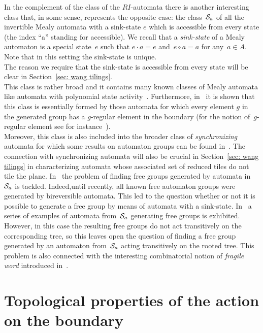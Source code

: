 \documentclass{amsart}
\begin{document}
In the complement of the class of the $RI$-automata there is
another interesting class that, in some sense, represents the opposite case: the class~${\hbox{${\mathcal S}_{a}$}}$ of all the invertible Mealy automata with a sink-state $e$ which is accessible from every state (the index ``a'' standing for accessible). We recall that a \emph{sink-state} of a Mealy automaton is a special state~$e$ such that $e{{{\cdot}}} a=e$ and~$e{{{\circ}}} a=a$ for any~$a\in A$. Note that in this setting the sink-state is unique.\\
The reason we require that the sink-state is accessible from every state will be clear in Section~\ref{sec: wang tilings}.\\
This class is rather broad and it contains many known classes of Mealy automata like automata with polynomial state activity~\cite{Sidki}. Furthermore, in~\cite[Proposition 6]{DaRo14} it is shown that this class is essentially formed by those automata for which every element $g$ in the generated group has a $g$-regular element in the boundary (for the notion of~$g$-regular element see for instance~\cite{Nekra10}).\\
  Moreover, this class is also included into the broader class of \emph{synchronizing} automata for which some results on automaton groups can be found in~\cite{DaRo13}. The connection with synchronizing automata will also be crucial in Section~\ref{sec: wang tilings} in characterizing automata whose associated set of reduced tiles do not tile the plane. In~\cite{DaRo15}  the problem of finding free groups generated by automata in~${\hbox{${\mathcal S}_{a}$}}$ is tackled. Indeed,until recently, all known free automaton groups were generated by bireversible automata.
This led to the question whether or not it is possible to generate a free group by means of automata with a sink-state. In~\cite{DaRo15}  a series of examples of automata from~${\hbox{${\mathcal S}_{a}$}}$ generating free groups is exhibited. However, in this case the resulting free groups do not act transitively on the corresponding tree, so this leaves open the question of finding a free group generated by an automaton from~${\hbox{${\mathcal S}_{a}$}}$ acting transitively on the rooted tree. This problem is also connected with the interesting combinatorial notion of \emph{fragile word} introduced in~\cite{DaRo15}.

\section{Topological properties of the action on the boundary}\label{sec: dynamics}
\end{document}
